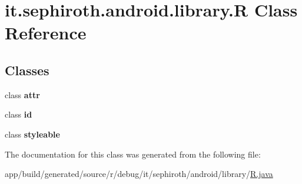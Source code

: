 \hypertarget{classit_1_1sephiroth_1_1android_1_1library_1_1_r}{}\section{it.\+sephiroth.\+android.\+library.\+R Class Reference}
\label{classit_1_1sephiroth_1_1android_1_1library_1_1_r}
\subsection*{Classes}
\begin{DoxyCompactItemize}
\item 
class {\bfseries attr}
\item 
class {\bfseries id}
\item 
class {\bfseries styleable}
\end{DoxyCompactItemize}


The documentation for this class was generated from the following file\+:\begin{DoxyCompactItemize}
\item 
app/build/generated/source/r/debug/it/sephiroth/android/library/\hyperlink{app_2build_2generated_2source_2r_2debug_2it_2sephiroth_2android_2library_2_r_8java}{R.\+java}\end{DoxyCompactItemize}
